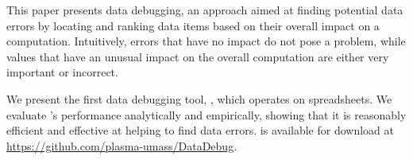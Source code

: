 This paper presents data debugging, an approach aimed at
finding potential data errors by locating and ranking data items based on their
overall impact on a computation. Intuitively, errors that have no
impact do not pose a problem, while values that have an unusual impact
on the overall computation are either very important or incorrect.

We present the first data debugging
tool, \checkcell{}, which operates on spreadsheets. We evaluate
\checkcell{}'s performance analytically and empirically, showing that
it is reasonably efficient and effective at helping to find data
errors. \checkcell{} is available for download at
\url{https://github.com/plasma-umass/DataDebug}.


